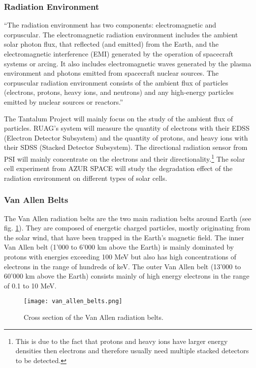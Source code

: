 \subsubsection{Radiation Environment}
\label{sec:radiation_environment}
``The radiation environment has two components: electromagnetic and corpuscular. 
The electromagnetic radiation environment includes the ambient solar photon flux, that reflected (and emitted) from the Earth, and the electromagnetic interference (EMI) generated by the operation of spacecraft systems or arcing.
It also includes electromagnetic waves generated by the plasma environment and photons emitted from spacecraft nuclear sources.
The corpuscular radiation environment consists of the ambient flux of particles (electrons, protons, heavy ions, and neutrons) and any high-energy particles emitted by nuclear sources or reactors.''\cite{hastings2004spacecraft}

The Tantalum Project will mainly focus on the study of the ambient flux of particles.
RUAG's system will measure the quantity of electrons with their EDSS (Electron Detector Subsystem) and the quantity of protons, and heavy ions with their SDSS (Stacked Detector Subsystem).
The directional radiation sensor from PSI will mainly concentrate on the electrons and their directionality.\footnote{This is due to the fact that protons and heavy ions have larger energy densities then electrons and therefore usually need multiple stacked detectors to be detected.}
The solar cell experiment from AZUR SPACE will study the degradation effect of the radiation environment on different types of solar cells.

\subsubsection{Van Allen Belts}
\label{sec:van_allen}
The Van Allen radiation belts are the two main radiation belts around Earth (see fig. \ref{fig:van_allen_belts}).
They are composed of energetic charged particles, mostly originating from the solar wind, that have been trapped in the Earth's magnetic field.
The inner Van Allen belt (1'000 to 6'000 km above the Earth) is mainly dominated by protons with energies exceeding 100 MeV but also has high concentrations of electrons in the range of hundreds of keV.
The outer Van Allen belt (13'000 to 60'000 km above the Earth) consists mainly of high energy electrons in the range of 0.1 to 10 MeV.\cite{wikipedia2016vanallen}

\begin{figure}[H]
    \centering
    \texttt{[image: van\_allen\_belts.png]}
    \caption[Van Allen Radiation Belts]{Cross section of the Van Allen radiation belts.\cite{wikipedia2016vanallen}}
    \label{fig:van_allen_belts}
\end{figure}


